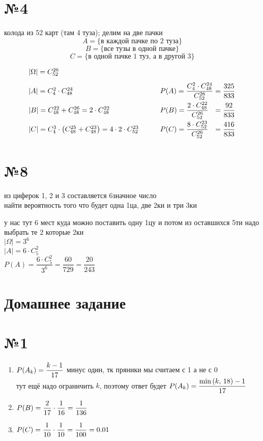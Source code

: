 \documentclass{article}
\newcommand{\hr}{\par\vspace{.5\baselineskip}\noindent\hrulefill\par}
\begin{document}
  \newpage
  \section*{№4}
  колода из 52 карт (там 4 туза); делим на две пачки
  $$ A = \{ \text{в каждой пачке по } 2 \text{ туза} \} $$
  $$ B = \{ \text{все тузы в одной пачке} \} $$
  $$ C = \{ \text{в одной пачке } 1 \text{ туз, а в другой } 3 \} $$

  \vspace{.5cm}
  $$\begin{matrix}
    \left|\Omega\right| = C^{26}_{52} \hfill \qquad &  \\[.3cm]
    \left|A\right| = C^{2}_{4} \cdot C^{24}_{48} \hfill \qquad &
      P(A) = \dfrac{C^{2}_{4} \cdot C^{24}_{48}}{C^{26}_{52}} \hfill = \dfrac{325}{833} \\[.3cm]
    \left|B\right| = C^{22}_{48} + C^{26}_{48} = 2 \cdot C^{22}_{48} \hfill \qquad &
      P(B) = \dfrac{2 \cdot C^{22}_{48}}{C^{26}_{52}} \hfill = \dfrac{92}{833} \\[.3cm]
    \left|C\right| = C^{3}_{4} \cdot \left(C^{25}_{48} + C^{23}_{48} \right) = 4 \cdot 2 \cdot C^{23}_{52} \hfill \qquad &
      P(C) = \dfrac{8 \cdot C^{23}_{52}}{C^{26}_{52}} \hfill = \dfrac{416}{833} \\[.3cm]
  \end{matrix}$$

  \section*{№8}
  из циферок 1, 2 и 3 составляется 6значное число \\
  найти вероятность того что будет одна 1ца, две 2ки и три 3ки

  \vspace{.5cm}\noindent
  у нас тут $6$ мест куда можно поставить одну 1цу и потом из оставшихся 5ти надо выбрать те 2 которые 2ки \\
  $ \left|\Omega\right| = 3^6 $ \\
  $ \left|A\right| = 6 \cdot C^2_5 $ \qquad \\
  $ P(A) = \dfrac{6 \cdot C^2_5}{3^6} = \dfrac{60}{729} = \dfrac{20}{243} $

  \hr
  \section*{Домашнее задание}
  \section*{№1}
  \begin{enumerate}[label=\realasbuk*)]
    \item $\displaystyle P(A_k) = \frac{k-1}{17}$ \qquad минус один, тк пряники мы считаем с 1 а не с 0 \\
      тут ещё надо ограничить $k$, поэтому ответ будет
      $\displaystyle P(A_k) = \frac{\min\left(k,\, 18\right)-1}{17}$
    \item $\displaystyle P(B) = \frac{2}{17} \cdot \frac{1}{16} = \frac{1}{136} $
    \item $\displaystyle P(C) = \frac{1}{10} \cdot \frac{1}{10} = \frac{1}{100} = 0.01$
  \end{enumerate}
\end{document}

